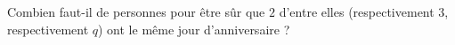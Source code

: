 Combien faut-il de personnes pour être sûr que $2$ d'entre elles (respectivement $3$, respectivement $q$) ont le même jour d'anniversaire ?

